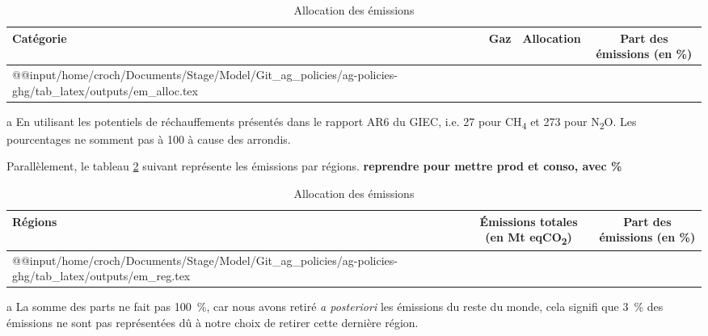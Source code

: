\begin{table}[h]
    \centering
    \begin{threeparttable}
        \begin{tabularx}{\textwidth}{p{1.5in}p{1.2in}p{1.2in}c}
            \textbf{Catégorie} & \textbf{Gaz} & \textbf{Allocation} & \textbf{Part des émissions}\tnote{a} (en \%) \\ \hline
            \csname @@input\endcsname /home/croch/Documents/Stage/Model/Git_ag_policies/ag-policies-ghg/tab_latex/outputs/em_alloc.tex
            \hline
        \end{tabularx}
        \begin{tablenotes}
            \footnotesize
            \item[a] En utilisant les potentiels de réchauffements présentés dans le rapport AR6 du GIEC, i.e. 27 pour CH\textsubscript{4} et 273 pour N\textsubscript{2}O. Les pourcentages ne somment pas à 100 à cause des arrondis.
        \end{tablenotes}
        \caption{Allocation des émissions}
        \label{tab:em_allocation}
    \end{threeparttable}
\end{table}

Parallèlement, le tableau \ref{tab:em_reg} suivant représente les émissions par régions. \textbf{reprendre pour mettre prod et conso, avec \%}
\begin{table}[h]
    \centering
    \begin{threeparttable}
        \begin{tabularx}{\textwidth}{p{1.9in}cc}
            \textbf{Régions} & \textbf{Émissions totales} (en Mt eqCO\textsubscript{2}) & \textbf{Part des émissions}\tnote{a} (en \%) \\ \hline
            \csname @@input\endcsname /home/croch/Documents/Stage/Model/Git_ag_policies/ag-policies-ghg/tab_latex/outputs/em_reg.tex
            \hline
        \end{tabularx}
        \begin{tablenotes}
            \footnotesize
            \item[a] La somme des parts ne fait pas 100~\%, car nous avons retiré \textit{a posteriori} les émissions du reste du monde, cela signifi que 3~\% des émissions ne sont pas représentées dû à notre choix de retirer cette dernière région.
        \end{tablenotes}
        \caption{Allocation des émissions}
        \label{tab:em_reg}
    \end{threeparttable}
\end{table}

